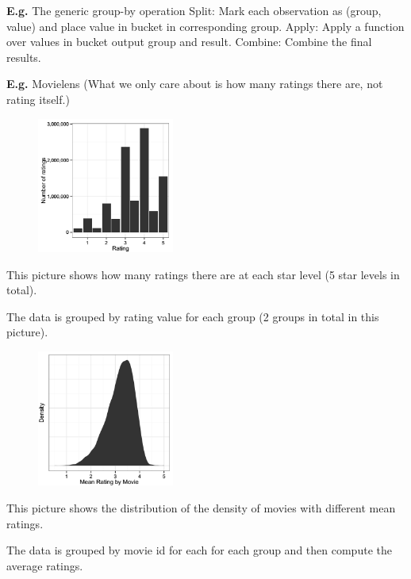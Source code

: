\textbf{E.g.} The generic group-by operation
Split: Mark each observation as (group, value) and place value in bucket in corresponding group.
Apply: Apply a function over values in bucket output group and result.
Combine: Combine the final results.

\textbf{E.g.} Movielens (What we only care about is how many ratings there are, not rating itself.)

\begin{figure}[ht]
  \begin{center}
    \includegraphics[width=0.4\textwidth]{figures/scribe_notes_1.png}
    \label{fig:scribe_notes_1}
  \end{center}
\end{figure}
This picture shows how many ratings there are at each star level (5 star levels in total).

The data is grouped by rating value for each group (2 groups in total in this picture).

\newpage
\begin{figure}[ht]
  \begin{center}
    \includegraphics[width=0.4\textwidth]{figures/scribe_notes_2.png}
    \label{fig:scribe_notes_2}
  \end{center}
\end{figure}

This picture shows the distribution of the density of movies with different mean ratings.

The data is grouped by movie id for each for each group and then compute the average ratings.

